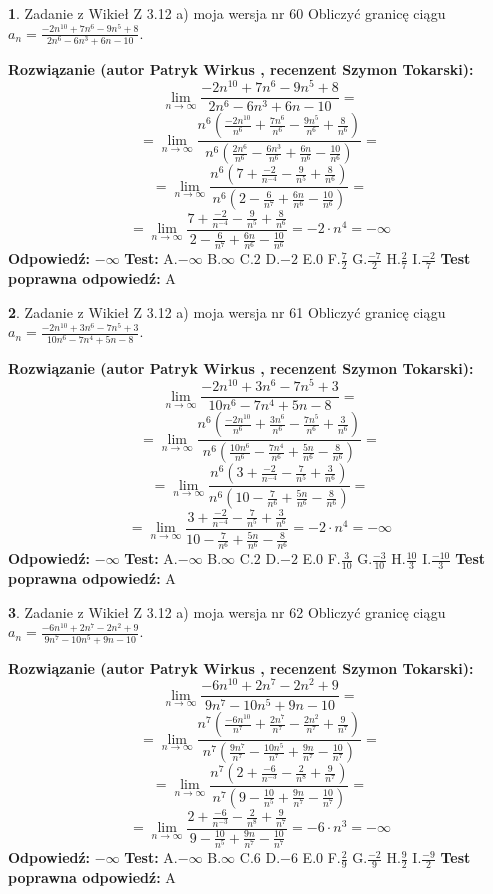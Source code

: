 \documentclass[12pt, a4paper]{article}
\theoremstyle{definition} %
\newtheorem{zad}{}
\newcommand{\zadStart}[1]{\begin{zad}#1\newline}
\newcommand{\zadStop}{\end{zad}}
\newcommand{\rozwStart}[2]{\noindent \textbf{Rozwiązanie (autor #1 , recenzent #2): }\newline}
\newcommand{\rozwStop}{\newline}
\newcommand{\odpStart}{\noindent \textbf{Odpowiedź:}\newline}
\newcommand{\odpStop}{\newline}
\newcommand{\testStart}{\noindent \textbf{Test:}\newline}
\newcommand{\testStop}{\newline}
\newcommand{\kluczStart}{\noindent \textbf{Test poprawna odpowiedź:}\newline}
\newcommand{\kluczStop}{\newline}
\begin{document}
\zadStart{Zadanie z Wikieł Z 3.12 a) moja wersja nr 60}
Obliczyć granicę ciągu $a_{n}=\frac{-2n^{10}+7n^{6}-9n^{5}+8}{2n^{6}-6n^{3}+6n-10}$.
\zadStop
\rozwStart{Patryk Wirkus}{Szymon Tokarski}
$$\lim\limits_{n\to\infty}\frac{-2n^{10}+7n^{6}-9n^{5}+8}{2n^{6}-6n^{3}+6n-10}=$$
$$=\lim\limits_{n\to\infty}\frac{n^{6}\left(\frac{-2n^{10}}{n^{6}}+\frac{7n^{6}}{n^{6}}-\frac{9n^{5}}{n^{6}}+\frac{8}{n^{6}}\right)}{n^{6}\left(\frac{2n^{6}}{n^{6}}-\frac{6n^{3}}{n^{6}}+\frac{6n}{n^{6}}-\frac{10}{n^{6}}\right)}=$$
$$=\lim\limits_{n\to\infty}\frac{n^{6}\left(7+\frac{-2}{n^{-4}}-\frac{9}{n^{5}}+\frac{8}{n^{6}}\right)}
{n^{6}\left(2-\frac{6}{n^{7}}+\frac{6n}{n^{6}}-\frac{10}{n^{6}}\right)}=$$
$$=\lim\limits_{n\to\infty}\frac{7+\frac{-2}{n^{-4}}-\frac{9}{n^{5}}+\frac{8}{n^{6}}}{2-\frac{6}{n^{7}}+\frac{6n}{n^{6}}-\frac{10}{n^{6}}}=-2\cdot n^{4} = -\infty$$
\rozwStop
\odpStart
$-\infty$
\odpStop
\testStart
A.$-\infty$
B.$\infty$
C.$2$
D.$-2$
E.$0$
F.$\frac{7}{2}$
G.$\frac{-7}{2}$
H.$\frac{2}{7}$
I.$\frac{-2}{7}$
\testStop
\kluczStart
A
\kluczStop



\zadStart{Zadanie z Wikieł Z 3.12 a) moja wersja nr 61}
Obliczyć granicę ciągu $a_{n}=\frac{-2n^{10}+3n^{6}-7n^{5}+3}{10n^{6}-7n^{4}+5n-8}$.
\zadStop
\rozwStart{Patryk Wirkus}{Szymon Tokarski}
$$\lim\limits_{n\to\infty}\frac{-2n^{10}+3n^{6}-7n^{5}+3}{10n^{6}-7n^{4}+5n-8}=$$
$$=\lim\limits_{n\to\infty}\frac{n^{6}\left(\frac{-2n^{10}}{n^{6}}+\frac{3n^{6}}{n^{6}}-\frac{7n^{5}}{n^{6}}+\frac{3}{n^{6}}\right)}{n^{6}\left(\frac{10n^{6}}{n^{6}}-\frac{7n^{4}}{n^{6}}+\frac{5n}{n^{6}}-\frac{8}{n^{6}}\right)}=$$
$$=\lim\limits_{n\to\infty}\frac{n^{6}\left(3+\frac{-2}{n^{-4}}-\frac{7}{n^{5}}+\frac{3}{n^{6}}\right)}
{n^{6}\left(10-\frac{7}{n^{6}}+\frac{5n}{n^{6}}-\frac{8}{n^{6}}\right)}=$$
$$=\lim\limits_{n\to\infty}\frac{3+\frac{-2}{n^{-4}}-\frac{7}{n^{5}}+\frac{3}{n^{6}}}{10-\frac{7}{n^{6}}+\frac{5n}{n^{6}}-\frac{8}{n^{6}}}=-2\cdot n^{4} = -\infty$$
\rozwStop
\odpStart
$-\infty$
\odpStop
\testStart
A.$-\infty$
B.$\infty$
C.$2$
D.$-2$
E.$0$
F.$\frac{3}{10}$
G.$\frac{-3}{10}$
H.$\frac{10}{3}$
I.$\frac{-10}{3}$
\testStop
\kluczStart
A
\kluczStop



\zadStart{Zadanie z Wikieł Z 3.12 a) moja wersja nr 62}
Obliczyć granicę ciągu $a_{n}=\frac{-6n^{10}+2n^{7}-2n^{2}+9}{9n^{7}-10n^{5}+9n-10}$.
\zadStop
\rozwStart{Patryk Wirkus}{Szymon Tokarski}
$$\lim\limits_{n\to\infty}\frac{-6n^{10}+2n^{7}-2n^{2}+9}{9n^{7}-10n^{5}+9n-10}=$$
$$=\lim\limits_{n\to\infty}\frac{n^{7}\left(\frac{-6n^{10}}{n^{7}}+\frac{2n^{7}}{n^{7}}-\frac{2n^{2}}{n^{7}}+\frac{9}{n^{7}}\right)}{n^{7}\left(\frac{9n^{7}}{n^{7}}-\frac{10n^{5}}{n^{7}}+\frac{9n}{n^{7}}-\frac{10}{n^{7}}\right)}=$$
$$=\lim\limits_{n\to\infty}\frac{n^{7}\left(2+\frac{-6}{n^{-3}}-\frac{2}{n^{8}}+\frac{9}{n^{7}}\right)}
{n^{7}\left(9-\frac{10}{n^{5}}+\frac{9n}{n^{7}}-\frac{10}{n^{7}}\right)}=$$
$$=\lim\limits_{n\to\infty}\frac{2+\frac{-6}{n^{-3}}-\frac{2}{n^{8}}+\frac{9}{n^{7}}}{9-\frac{10}{n^{5}}+\frac{9n}{n^{7}}-\frac{10}{n^{7}}}=-6\cdot n^{3} = -\infty$$
\rozwStop
\odpStart
$-\infty$
\odpStop
\testStart
A.$-\infty$
B.$\infty$
C.$6$
D.$-6$
E.$0$
F.$\frac{2}{9}$
G.$\frac{-2}{9}$
H.$\frac{9}{2}$
I.$\frac{-9}{2}$
\testStop
\kluczStart
A
\kluczStop
\end{document}
